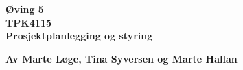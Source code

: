 \begin{titlepage}
\begin{center}

{\Huge \bf Øving 5} \\[2.0cm]
{\Huge \bf TPK4115} \\[2.0cm]
{\LARGE \bf Prosjektplanlegging og styring} \\[1.0cm]
\vspace{13cm}

{\bf Av Marte Løge, Tina Syversen og Marte Hallan}


\end{center}
\end{titlepage}